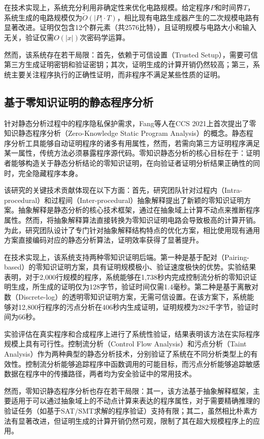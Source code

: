 在技术实现上，系统充分利用非确定性来优化电路规模。给定程序$P$和时间界$T$，系统生成的电路规模仅为$\tilde{O}(|P| \cdot T)$，相比现有电路生成器产生的二次规模电路有显著改进。证明仅包含12个群元素（共2576比特），且证明规模与电路大小和输入无关，验证仅需$O(|x|)$次密码学运算。

然而，该系统存在若干局限：首先，依赖于可信设置（Trusted Setup），需要可信第三方生成证明密钥和验证密钥；其次，证明生成的计算开销仍然较高；第三，系统主要关注程序执行的正确性证明，而非程序不满足某些性质的证明。

\subsection{基于零知识证明的静态程序分析}
针对静态分析过程中的程序隐私保护需求，Fang等人在CCS 2021上首次提出了零知识静态程序分析（Zero-Knowledge Static Program Analysis）的概念\cite{10.1145/3460120.3484795}。静态程序分析工具能够自动证明程序的诸多有用属性，然而，若需向第三方证明程序满足某一属性，传统方法必须暴露程序源代码。零知识静态分析的核心目标在于：证明者能够构造关于静态分析结论的零知识证明，在向验证者证明分析结果正确性的同时，完全隐藏程序本身。

该研究的关键技术贡献体现在以下方面：首先，研究团队针对过程内（Intra-procedural）和过程间（Inter-procedural）抽象解释提出了新颖的零知识证明方案。抽象解释是静态分析的核心技术框架，通过在抽象域上计算不动点来推断程序属性。然而，将抽象解释算法直接转换为零知识证明电路会导致极高的计算开销。为此，研究团队设计了专门针对抽象解释结构特点的优化方案，相比使用现有通用方案直接编码对应的静态分析算法，证明效率获得了显著提升。

在技术实现上，该系统支持两种零知识证明后端。第一种是基于配对（Pairing-based）的零知识证明方案，具有证明规模极小、验证速度极快的优势。实验结果表明，对于2,000行规模的程序，系统能够在1,738秒内完成控制流分析的零知识证明生成，所生成的证明仅为128字节，验证时间仅需1.4毫秒。第二种是基于离散对数（Discrete-log）的透明零知识证明方案，无需可信设置。在该方案下，系统能够对12,800行程序的污点分析在406秒内生成证明，证明规模为282千字节，验证时间为66秒。

实验评估在真实程序和合成程序上进行了系统性验证，结果表明该方法在实际程序规模上具有可行性。控制流分析（Control Flow Analysis）和污点分析（Taint Analysis）作为两种典型的静态分析技术，分别验证了系统在不同分析类型上的有效性。控制流分析能够追踪程序中函数调用的可能目标，而污点分析能够追踪敏感数据在程序中的传播路径，两者均为安全验证中的常用技术。

然而，零知识静态程序分析也存在若干局限：其一，该方法基于抽象解释框架，主要适用于可以通过抽象域上的不动点计算来表达的程序属性，对于需要精确推理的验证任务（如基于SAT/SMT求解的程序验证）支持有限；其二，虽然相比朴素方法有显著改进，但证明生成的计算开销仍然可观，限制了其在超大规模程序上的应用。

